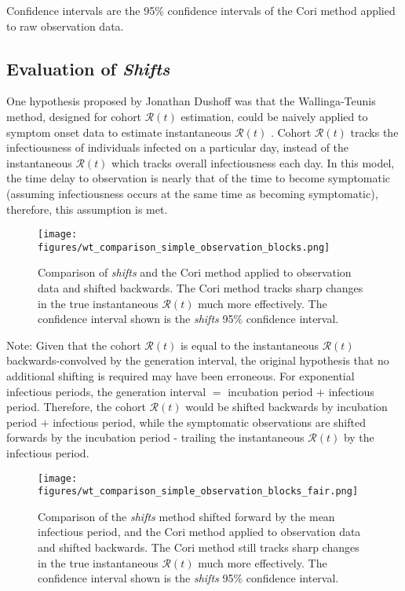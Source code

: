 \documentclass{article}
\newcommand{\nR}{\mathcal{R}}
\begin{document}
{Confidence intervals are the 95\% confidence intervals of the Cori method applied to raw observation data. 

\subsection{Evaluation of \emph{Shifts}}
One hypothesis proposed by Jonathan Dushoff was that the Wallinga-Teunis method, designed for cohort $\nR(t)$ estimation, could be naively applied to symptom onset data to estimate instantaneous $\nR(t)$ \cite{shifts}. Cohort $\nR(t)$ tracks the infectiousness of individuals infected on a particular day, instead of the instantaneous $\nR(t)$ which tracks overall infectiousness each day. In this model, the time delay to observation is nearly that of the time to become symptomatic (assuming infectiousness occurs at the same time as becoming symptomatic), therefore, this assumption is met.

\clearpage
\begin{figure}[h!]
\centering
\texttt{[image: figures/wt\_comparison\_simple\_observation\_blocks.png]}
\caption{Comparison of \emph{shifts} and the Cori method applied to observation data and shifted backwards. The Cori method tracks sharp changes in the true instantaneous $\nR(t)$ much more effectively. The confidence interval shown is the \emph{shifts} 95\% confidence interval.} 
\end{figure}

Note: Given that the cohort $\nR(t)$ is equal to the instantaneous $\nR(t)$ backwards-convolved by the generation interval, the original hypothesis that no additional shifting is required may have been erroneous. For exponential infectious periods, the generation interval $=$ incubation period $+$ infectious period. Therefore, the cohort $\nR(t)$ would be shifted backwards by incubation period $+$ infectious period, while the symptomatic observations are shifted forwards by the incubation period - trailing the instantaneous $\nR(t)$ by the infectious period.

\clearpage
\begin{figure}[h!]
\centering
\texttt{[image: figures/wt\_comparison\_simple\_observation\_blocks\_fair.png]}
\caption{Comparison of the \emph{shifts} method shifted forward by the mean infectious period, and the Cori method applied to observation data and shifted backwards. The Cori method still tracks sharp changes in the true instantaneous $\nR(t)$ much more effectively. The confidence interval shown is the \emph{shifts} 95\% confidence interval.} 
\end{figure}


}
\end{document}
